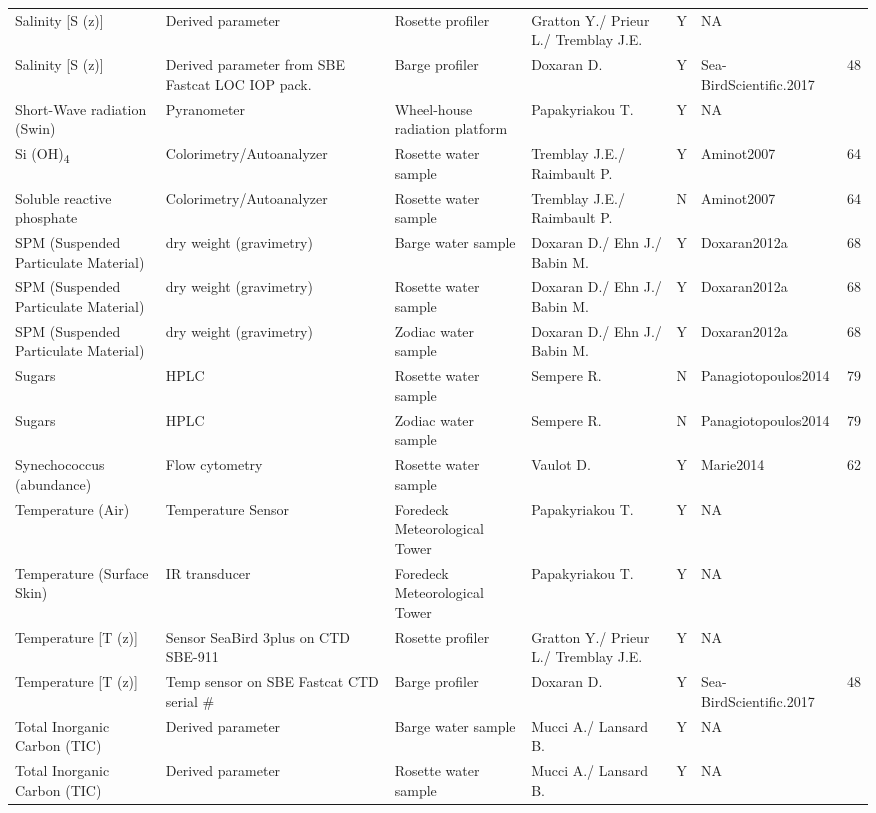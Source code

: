 \begin{ThreePartTable}
\begin{longtable}[t]{lllllll}
\addlinespace
Salinity [S (z)] & Derived parameter & Rosette profiler & Gratton Y./ Prieur L./ Tremblay J.E. & Y & NA & \\
Salinity [S (z)] & Derived parameter from SBE Fastcat LOC IOP pack. & Barge profiler & Doxaran D. & Y & Sea-BirdScientific.2017 & 48\\
Short-Wave radiation (Swin) & Pyranometer & Wheel-house radiation platform & Papakyriakou T. & Y & NA & \\
Si (OH)\textsubscript{4} & Colorimetry/Autoanalyzer & Rosette water sample & Tremblay J.E./ Raimbault P. & Y & Aminot2007 & 64\\
Soluble reactive phosphate & Colorimetry/Autoanalyzer & Rosette water sample & Tremblay J.E./ Raimbault P. & N & Aminot2007 & 64\\
\addlinespace
SPM (Suspended Particulate Material) & dry weight (gravimetry) & Barge water sample & Doxaran D./ Ehn J./ Babin M. & Y & Doxaran2012a & 68\\
SPM (Suspended Particulate Material) & dry weight (gravimetry) & Rosette water sample & Doxaran D./ Ehn J./ Babin M. & Y & Doxaran2012a & 68\\
SPM (Suspended Particulate Material) & dry weight (gravimetry) & Zodiac water sample & Doxaran D./ Ehn J./ Babin M. & Y & Doxaran2012a & 68\\
Sugars & HPLC & Rosette water sample & Sempere R. & N & Panagiotopoulos2014 & 79\\
Sugars & HPLC & Zodiac water sample & Sempere R. & N & Panagiotopoulos2014 & 79\\
\addlinespace
Synechococcus (abundance) & Flow cytometry & Rosette water sample & Vaulot D. & Y & Marie2014 & 62\\
Temperature (Air) & Temperature Sensor & Foredeck Meteorological Tower & Papakyriakou T. & Y & NA & \\
Temperature (Surface Skin) & IR transducer & Foredeck Meteorological Tower & Papakyriakou T. & Y & NA & \\
Temperature [T (z)] & Sensor SeaBird 3plus on CTD SBE-911 & Rosette profiler & Gratton Y./ Prieur L./ Tremblay J.E. & Y & NA & \\
Temperature [T (z)] & Temp sensor on SBE Fastcat CTD serial \# & Barge profiler & Doxaran D. & Y & Sea-BirdScientific.2017 & 48\\
\addlinespace
Total Inorganic Carbon (TIC) & Derived parameter & Barge water sample & Mucci A./ Lansard B. & Y & NA & \\
Total Inorganic Carbon (TIC) & Derived parameter & Rosette water sample & Mucci A./ Lansard B. & Y & NA & \\

\end{longtable}
\end{ThreePartTable}
